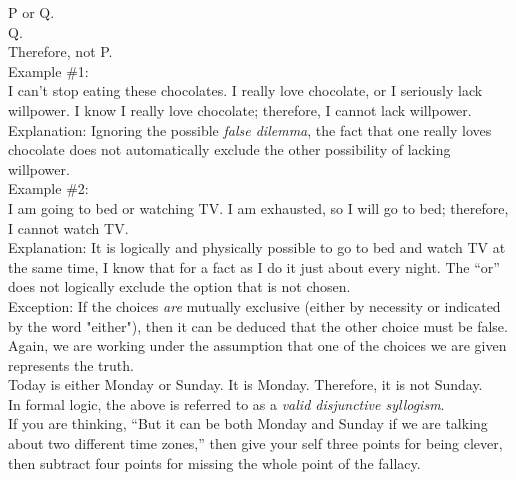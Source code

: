 \documentclass[a4paper,12pt,single,pdftex]{scrartcl}
\begin{document}
    
      P or Q.
    \\

    
      Q.
    \\

    
      Therefore, not P.
    \\

    
      Example \#1:
    \\

    
      I can’t stop eating these chocolates.  I really love chocolate, or I seriously lack willpower.  I know I really love chocolate; therefore, I cannot lack willpower.
    \\

    
      Explanation: Ignoring the possible {\it false dilemma}, the fact that one really loves chocolate does not automatically exclude the other possibility of lacking willpower.
    \\

    
      Example \#2:
    \\

    
      I am going to bed or watching TV.  I am exhausted, so I will go to bed; therefore, I cannot watch TV.
    \\

    
      Explanation: It is logically and physically possible to go to bed and watch TV at the same time, I know that for a fact as I do it just about every night.  The “or” does not logically exclude the option that is not chosen.
    \\

    
      Exception: If the choices {\it are} mutually exclusive (either by necessity or indicated by the word "either"), then it can be deduced that the other choice must be false.  Again, we are working under the assumption that one of the choices we are given represents the truth.
    \\

    
      Today is either Monday or Sunday.  It is Monday.  Therefore, it is not Sunday.
    \\

    
      In formal logic, the above is referred to as a {\it valid disjunctive syllogism}.
    \\

    
      If you are thinking, “But it can be both Monday and Sunday if we are talking about two different time zones,” then give your self three points for being clever, then subtract four points for missing the whole point of the fallacy.
    \\
\end{document}
